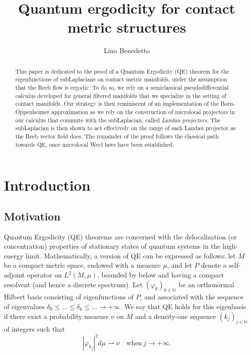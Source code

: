 \documentclass[12pt,a4paper]{amsart}
\title[]{Quantum ergodicity for contact metric structures}
\author[L. Benedetto]{Lino Benedetto}
\theoremstyle{plain}
\theoremstyle{definition}
\theoremstyle{remark}
\numberwithin{equation}{section}
\theoremstyle{definition}
\def\N{{\mathbb N}}%
\numberwithin{equation}{section}
\begin{document}
\begin{abstract}
    This paper is dedicated to the proof of a Quantum Ergodicity (QE) theorem for the eigenfunctions of subLaplacians on contact metric manifolds, under the assumption that the Reeb flow is ergodic. To do so, we rely on a semiclassical pseudodifferential calculus developed for general filtered manifolds that we specialize in the setting of contact manifolds. Our strategy is then reminiscent of an implementation of the Born-Oppenheimer approximation as we rely on the construction of microlocal projectors in our calculus that commute with the subLaplacian, called \emph{Landau projectors}. The subLaplacian is then shown to act effectively on the range of each Landau projector as the Reeb vector field does. The remainder of the proof follows the classical path towards QE, once microlocal Weyl laws have been established.
\end{abstract}

\maketitle

\tableofcontents

\section{Introduction}

\subsection{Motivation}

Quantum Ergodicity (QE) theorems are concerned with the delocalization (or concentration) properties of stationary states of quantum systems in the high-energy limit. Mathematically, a version of QE can be expressed as follows: let $M$ be a compact metric space, endowed with a measure $\mu$, and let $P$ denote a self-adjoint operator on $L^2(M,\mu)$, bounded by below and having a compact resolvent (and hence a discrete spectrum). Let $(\varphi_k)_{k\in\N}$ be an orthonormal Hilbert basis consisting of eigenfunctions of $P$, and associated with the sequence of eigenvalues $\delta_0\leq\dots\leq\delta_k\leq\dots\rightarrow+\infty$. We say that QE holds for this eigenbasis if there exist a probability measure $\nu$ on $M$ and a density-one sequence $(k_j)_{j\in\N}$ of integers such that 
\begin{equation*}
    |\varphi_{k_j}|^2d\mu \rightharpoonup \nu\quad\mbox{when}\ j\rightarrow+\infty.
\end{equation*}
\end{document}
